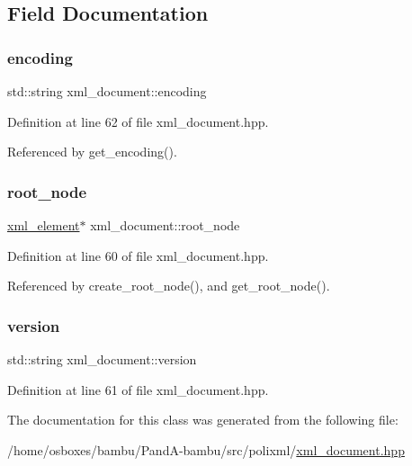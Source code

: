 \subsection{Field Documentation}
\mbox{\label{classxml__document_a2c30e0168483da7251ded20751cfe421}} 
\subsubsection{\texorpdfstring{encoding}{encoding}}
{\footnotesize\ttfamily std\+::string xml\+\_\+document\+::encoding\hspace{0.3cm}{\ttfamily [private]}}



Definition at line 62 of file xml\+\_\+document.\+hpp.



Referenced by get\+\_\+encoding().

\mbox{\label{classxml__document_aeba8f7a07df1ca70afc36515de1bfd03}} 
\subsubsection{\texorpdfstring{root\+\_\+node}{root\_node}}
{\footnotesize\ttfamily \hyperlink{classxml__element}{xml\+\_\+element}$\ast$ xml\+\_\+document\+::root\+\_\+node\hspace{0.3cm}{\ttfamily [private]}}



Definition at line 60 of file xml\+\_\+document.\+hpp.



Referenced by create\+\_\+root\+\_\+node(), and get\+\_\+root\+\_\+node().

\mbox{\label{classxml__document_a8ce53fb709ec7ba0697df31d1147c864}} 
\subsubsection{\texorpdfstring{version}{version}}
{\footnotesize\ttfamily std\+::string xml\+\_\+document\+::version\hspace{0.3cm}{\ttfamily [private]}}



Definition at line 61 of file xml\+\_\+document.\+hpp.



The documentation for this class was generated from the following file\+:\begin{DoxyCompactItemize}
\item 
/home/osboxes/bambu/\+Pand\+A-\/bambu/src/polixml/\hyperlink{xml__document_8hpp}{xml\+\_\+document.\+hpp}\end{DoxyCompactItemize}
